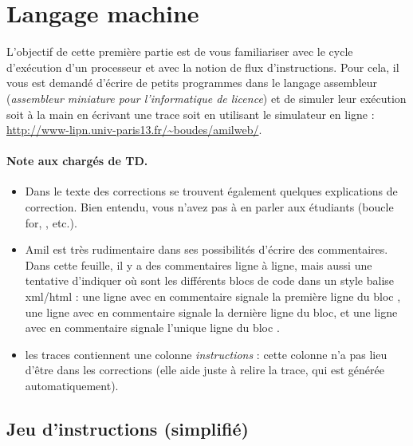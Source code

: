 
\newcommand{\commentaire}[1]{}


\vspace{-1cm}
\section{Langage machine}

L'objectif de cette première partie est de vous familiariser avec le cycle d'exécution
d'un processeur et avec la notion de flux d'instructions. Pour cela,
il vous est demandé d'écrire de petits programmes dans le langage
assembleur  (\emph{assembleur miniature pour l'informatique de
  licence}) et de simuler leur exécution soit à la main en écrivant une trace soit en utilisant le
simulateur en ligne : \url{http://www-lipn.univ-paris13.fr/~boudes/amilweb/}.

\begin{correction}
 \paragraph{Note aux chargés de TD.}
  \begin{itemize}
  \item Dans le texte des corrections se trouvent également quelques
    explications de correction. Bien entendu, vous n'avez pas à en
    parler aux étudiants (boucle for, , etc.).
  \item Amil est très rudimentaire dans ses possibilités d'écrire des
    commentaires. Dans cette feuille, il y a des commentaires ligne à
    ligne, mais aussi une tentative d'indiquer où sont les différents
    blocs de code dans un style balise xml/html : une ligne avec en
    commentaire  signale la première ligne du bloc
    , une ligne avec en commentaire  signale la
    dernière ligne du bloc, et une ligne avec en commentaire
     signale l'unique ligne du bloc .
  \item les traces contiennent une colonne \emph{instructions} : cette
    colonne n'a pas lieu d'être dans les corrections (elle aide juste
    à relire la trace, qui est générée automatiquement).
  \end{itemize}
\end{correction}

\subsection*{Jeu d'instructions (simplifié)}

\noindent

